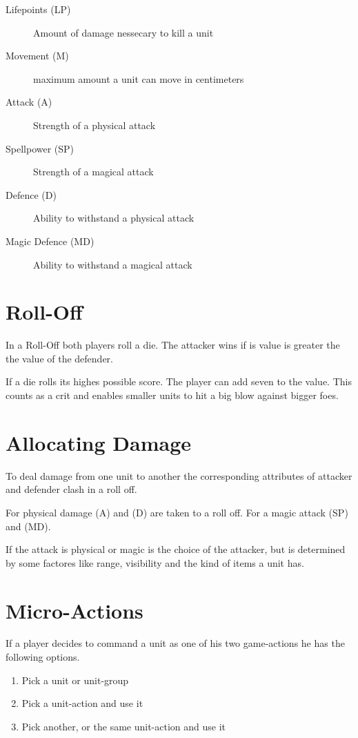 \documentclass[a5paper,pagesize,10pt,bibtotoc,pointlessnumbers,
normalheadings,DIV=9,twoside=false]{scrbook}
\begin{document}
\begin{description}
\item[Lifepoints (LP)]
Amount of damage nessecary to kill a unit
\item[Movement (M)]
maximum amount a unit can move in centimeters
\item[Attack (A)]
Strength of a physical attack
\item[Spellpower (SP)]
Strength of a magical attack
\item[Defence (D)]
Ability to withstand a physical attack
\item[Magic Defence (MD)]
Ability to withstand a magical attack
\end{description}

\section{Roll-Off}
In a Roll-Off both players roll a die. The attacker wins if is value is greater the the value of the defender.

If a die rolls its highes possible score. The player can add seven to the value. This counts as a crit and enables smaller units to hit a big blow against bigger foes.

\section{Allocating Damage}
To deal damage from one unit to another the corresponding attributes of attacker and defender clash in a roll off.

For physical damage (A) and (D) are taken to a roll off. For a magic attack (SP) and (MD).

If the attack is physical or magic is the choice of the attacker, but is determined by some factores like range, visibility and the kind of items a unit has.

\section{Micro-Actions}
If a player decides to command a unit as one of his two game-actions he has the following options.

\begin{enumerate}
\item Pick a unit or unit-group
\item Pick a unit-action and use it
\item Pick another, or the same unit-action and use it
\end{enumerate}
\end{document}
